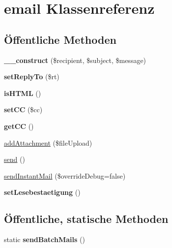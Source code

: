 \hypertarget{classemail}{}\section{email Klassenreferenz}
\label{classemail}
\subsection*{Öffentliche Methoden}
\begin{DoxyCompactItemize}
\item 
\mbox{\label{classemail_a644608a20f6a5a23c405cbeb2b83871b}} 
{\bfseries \+\_\+\+\_\+construct} (\$recipient, \$subject, \$message)
\item 
\mbox{\label{classemail_a1c9e1402a08b2ecd6470133f9e0e6d5f}} 
{\bfseries set\+Reply\+To} (\$rt)
\item 
\mbox{\label{classemail_a69b88a501d3d97821ca41d8d787722bb}} 
{\bfseries is\+H\+T\+ML} ()
\item 
\mbox{\label{classemail_a4fa41ebf6a0655539d55d51c7c3d840b}} 
{\bfseries set\+CC} (\$cc)
\item 
\mbox{\label{classemail_aaa7a4a330301032b41c7e8966054e990}} 
{\bfseries get\+CC} ()
\item 
\mbox{\hyperlink{classemail_a802b48dc37651e8c44f4d0584382bf0e}{add\+Attachment}} (\$file\+Upload)
\item 
\mbox{\hyperlink{classemail_aa8ee20c15a47f497aa4c980ea1548998}{send}} ()
\item 
\mbox{\hyperlink{classemail_ad02548f68725abf88f81619d5a470366}{send\+Instant\+Mail}} (\$override\+Debug=false)
\item 
\mbox{\label{classemail_abb583d1ddcf456f98c54abe45eb9c4b4}} 
{\bfseries set\+Lesebestaetigung} ()
\end{DoxyCompactItemize}
\subsection*{Öffentliche, statische Methoden}
\begin{DoxyCompactItemize}
\item 
\mbox{\label{classemail_a35105845033c724c358d532df55522b2}} 
static {\bfseries send\+Batch\+Mails} ()
\end{DoxyCompactItemize}


